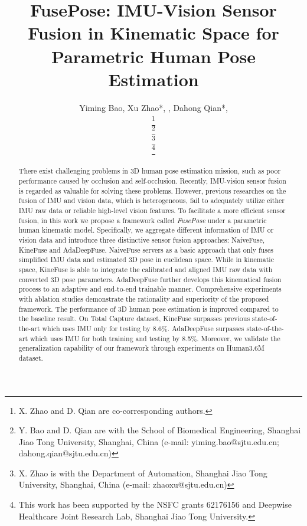 \documentclass[lettersize,journal]{IEEEtran}
\begin{document}
\title{FusePose: IMU-Vision Sensor Fusion in Kinematic Space for Parametric Human Pose Estimation}

\author{
Yiming Bao, Xu Zhao*, , Dahong Qian*, 

\thanks{X. Zhao and D. Qian are co-corresponding authors.}

\thanks{Y. Bao and D. Qian are with the School of Biomedical Engineering, Shanghai Jiao Tong University, Shanghai, China (e-mail: yiming.bao@sjtu.edu.cn; dahong.qian@sjtu.edu.cn)}

\thanks{X. Zhao is with the Department of Automation, Shanghai Jiao Tong University, Shanghai, China (e-mail: zhaoxu@sjtu.edu.cn)}

\thanks{This work has been supported by the NSFC grants 62176156 and Deepwise Healthcare Joint Research Lab, Shanghai Jiao Tong University.}
}



\maketitle

\begin{abstract}
There exist challenging problems in 3D human pose estimation mission, such as poor performance caused by occlusion and self-occlusion. Recently, IMU-vision sensor fusion is regarded as valuable for solving these problems. However, previous researches on the fusion of IMU and vision data, which is heterogeneous, fail to adequately utilize either IMU raw data or reliable high-level vision features. To facilitate a more efficient sensor fusion, in this work we propose a framework called \emph{FusePose} under a parametric human kinematic model. Specifically, we aggregate different information of IMU or vision data and introduce three distinctive sensor fusion approaches: NaiveFuse, KineFuse and AdaDeepFuse. NaiveFuse servers as a basic approach that only fuses simplified IMU data and estimated 3D pose in euclidean space. While in kinematic space, KineFuse is able to integrate the calibrated and aligned IMU raw data with converted 3D pose parameters. AdaDeepFuse further develops this kinematical fusion process to an adaptive and end-to-end trainable manner. Comprehensive experiments with ablation studies demonstrate the rationality and superiority of the proposed framework. The performance of 3D human pose estimation is improved compared to the baseline result. On Total Capture dataset, KineFuse surpasses previous state-of-the-art which uses IMU only for testing by 8.6\%. AdaDeepFuse surpasses state-of-the-art which uses IMU for both training and testing by 8.5\%. Moreover, we validate the generalization capability of our framework through experiments on Human3.6M dataset.
\end{abstract}
\end{document}
